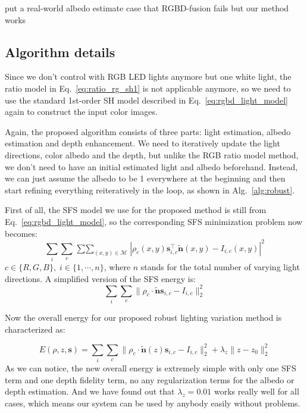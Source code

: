 {\color{red} put a real-world albedo estimate case that RGBD-fusion fails but our method works}


\subsection{Algorithm details}
Since we don't control with RGB LED lights anymore but one white light, the ratio model in Eq.~\ref{eq:ratio_rg_sh1} is not applicable anymore, so we need to use the standard 1st-order SH model described in Eq.~\ref{eq:rgbd_light_model} again to construct the input color images.

Again, the proposed algorithm consists of three parts: light estimation, albedo estimation and depth enhancement. 
We need to iteratively update the light directions, color albedo and the depth, but unlike the RGB ratio model method, we don't need to have an initial estimated light and albedo beforehand.
Instead, we can just assume the albedo to be 1 everywhere at the beginning and then start refining everything reiteratively in the loop, as shown in Alg.~\ref{alg:robust}.

First of all, the SFS model we use for the proposed method is still from Eq.~\ref{eq:rgbd_light_model}, so the corresponding SFS minimization problem now becomes:
\begin{equation}
    \sum_{i} \sum_{c} \mathop{\sum \sum}_{(x,y) \in \mathcal{M}} |\rho_c(x,y) \mathbf{s}_{i,c}^\top\tilde{\mathbf{n}}(x,y) - I_{i,c}(x,y)|^2 
\end{equation}
$c\in\{R,G,B\},\; i\in\{ 1, \cdots, n\}$, where $n$ stands for the total number of varying light directions.
A simplified version of the SFS energy is:
\begin{equation}
    \sum_{i} \sum_{c} \lVert\rho_c \cdot \tilde{\mathbf{n}}\mathbf{s}_{i,c} -  I_{i,c} \rVert_2^2 
\end{equation}

Now the overall energy for our proposed robust lighting variation method is characterized as:

\begin{equation}\label{eq:robust_energy}
    E(\rho, z, \mathbf{s}) = \sum_{i} \sum_{c} \lVert \rho_c \cdot \tilde{\mathbf{n}}(z)\mathbf{s}_{i,c}  - I_{i,c}\rVert_2^2  + \lambda_{z}\lVert z - z_0 \rVert_2^2
\end{equation}
As we can notice, the new overall energy is extremely simple with only one SFS term and one depth fidelity term, no any regularization terms for the albedo or depth estimation.
And we have found out that $\lambda_z = 0.01$ works really well for all cases, which means our system can be used by anybody easily without problems.

